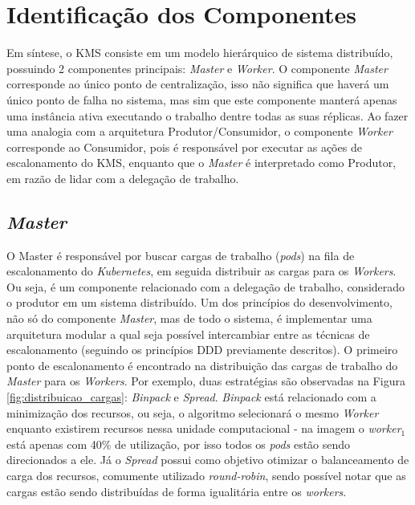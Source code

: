 \section{Identificação dos Componentes}

Em síntese, o \ac{KMS} consiste em um modelo hierárquico de sistema distribuído, possuindo 2 componentes principais: \textit{Master} e \textit{Worker}. O componente \textit{Master} corresponde ao único ponto de centralização, isso não significa que haverá um único ponto de falha no sistema, mas sim que este componente manterá apenas uma instância ativa executando o trabalho dentre todas as suas réplicas. Ao fazer uma analogia com a arquitetura Produtor/Consumidor, o componente \textit{Worker} corresponde ao Consumidor, pois é responsável por executar as ações de escalonamento do \ac{KMS}, enquanto que o \textit{Master} é interpretado como Produtor, em razão de lidar com a delegação de trabalho.



\subsection{\textit{Master}}

O Master é responsável por buscar cargas de trabalho (\textit{pods}) na fila de escalonamento do \textit{Kubernetes}, em seguida distribuir as cargas para os \textit{Workers}.  Ou seja, é um componente relacionado com a delegação de trabalho, considerado o produtor em um sistema distribuído. Um dos princípios do desenvolvimento, não só do componente \textit{Master}, mas de todo o sistema, é implementar uma arquitetura modular a qual seja possível intercambiar entre as técnicas de escalonamento (seguindo os princípios DDD previamente descritos). O primeiro ponto de escalonamento é encontrado na distribuição das cargas de trabalho do \textit{Master} para os \textit{Workers}. Por exemplo, duas estratégias são observadas na Figura \ref{fig:distribuicao_cargas}: \textit{Binpack} e \textit{Spread}. \textit{Binpack} está relacionado com a minimização dos recursos, ou seja, o algoritmo selecionará o mesmo \textit{Worker} enquanto existirem recursos nessa unidade computacional - na imagem o \textit{worker$_1$} está apenas com 40\% de utilização, por isso todos os \textit{pods} estão sendo direcionados a ele. Já o \textit{Spread} possui como objetivo otimizar o balanceamento de carga dos recursos, comumente utilizado \textit{round-robin}, sendo possível notar que as cargas estão sendo distribuídas de forma igualitária entre os \textit{workers}.

